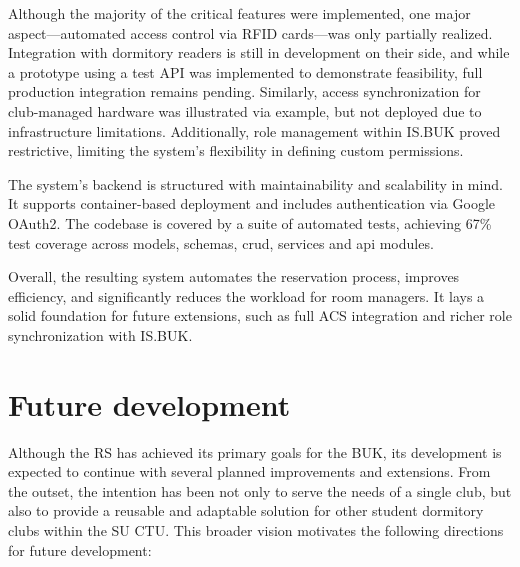 Although the majority of the critical features were implemented, one major aspect—automated access control via RFID cards—was only partially realized. Integration with dormitory readers is still in development on their side, and while a prototype using a test API was implemented to demonstrate feasibility, full production integration remains pending. Similarly, access synchronization for club-managed hardware was illustrated via example, but not deployed due to infrastructure limitations. Additionally, role management within IS.BUK proved restrictive, limiting the system’s flexibility in defining custom permissions.

The system’s backend is structured with maintainability and scalability in mind. It supports container-based deployment and includes authentication via Google OAuth2. The codebase is covered by a suite of automated tests, achieving 67\% test coverage across models, schemas, crud, services and api modules.

Overall, the resulting system automates the reservation process, improves efficiency, and significantly reduces the workload for room managers. It lays a solid foundation for future extensions, such as full ACS integration and richer role synchronization with IS.BUK.

\section{Future development}

Although the RS has achieved its primary goals for the BUK, its development is expected to continue with several planned improvements and extensions. From the outset, the intention has been not only to serve the needs of a single club, but also to provide a reusable and adaptable solution for other student dormitory clubs within the SU CTU. This broader vision motivates the following directions for future development:

